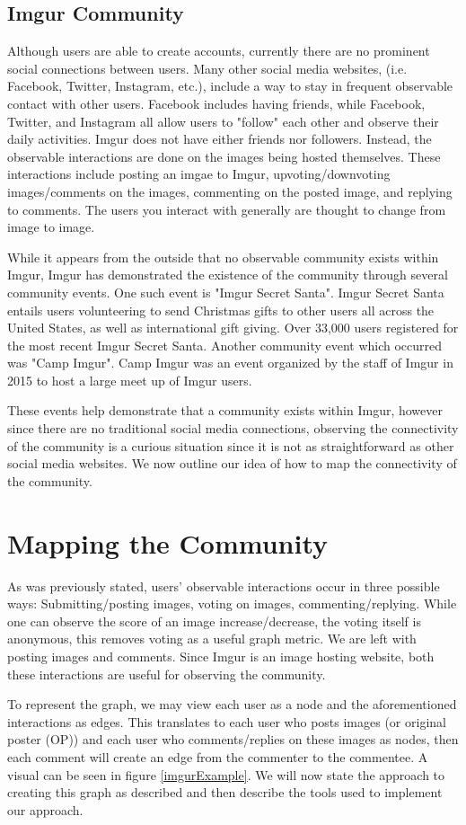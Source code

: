 \documentclass{article}
\begin{document}
\subsection{Imgur Community}\label{community}
\par Although users are able to create accounts, currently there are no prominent social connections between users. Many other social media websites, (i.e. Facebook, Twitter, Instagram, etc.), include a way to stay in frequent observable contact with other users. Facebook includes having friends, while Facebook, Twitter, and Instagram all allow users to "follow" each other and observe their daily activities. Imgur does not have either friends nor followers. Instead, the observable interactions are done on the images being hosted themselves. These interactions include posting an imgae to Imgur, upvoting/downvoting images/comments on the images, commenting on the posted image, and replying to comments. The users you interact with generally are thought to change from image to image. 
\par While it appears from the outside that no observable community exists within Imgur, Imgur has demonstrated the existence of the community through several community events. One such event is "Imgur Secret Santa". Imgur Secret Santa entails users volunteering to send Christmas gifts to other users all across the United States, as well as international gift giving. Over 33,000 users registered for the most recent Imgur Secret Santa\cite{gag}. Another community event which occurred was "Camp Imgur". Camp Imgur was an event organized by the staff of Imgur in 2015 to host a large meet up of Imgur users\cite{campimgur}. 
\par These events help demonstrate that a community exists within Imgur, however since there are no traditional social media connections, observing the connectivity of the community is a curious situation since it is not as straightforward as other social media websites. We now outline our idea of how to map the connectivity of the community.

\section{Mapping the Community}\label{map}
\par As was previously stated, users' observable interactions occur in three possible ways: Submitting/posting images, voting on images, commenting/replying. While one can observe the score of an image increase/decrease, the voting itself is anonymous, this removes voting as a useful graph metric. We are left with posting images and comments. Since Imgur is an image hosting website, both these interactions are useful for observing the community.
\par To represent the graph, we may view each user as a node and the aforementioned interactions as edges. This translates to each user who posts images (or original poster (OP)) and each user who comments/replies on these images as nodes, then each comment will create an edge from the commenter to the commentee. A visual can be seen in figure \ref{imgurExample}. We will now state the approach to creating this graph as described and then describe the tools used to implement our approach.
\end{document}
